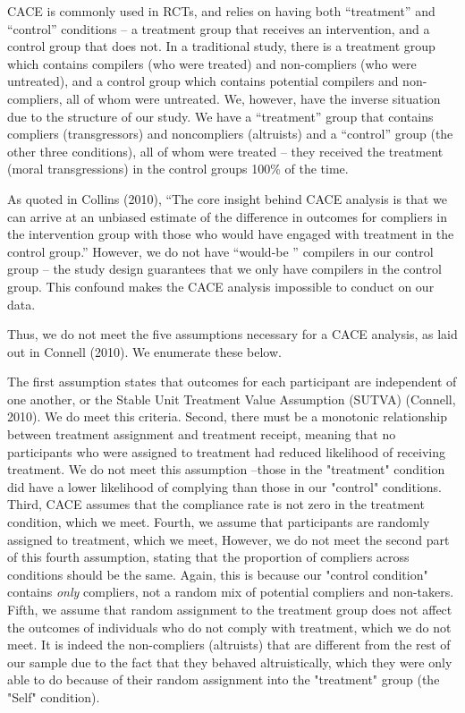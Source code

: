 \documentclass[12pt,]{article}
\begin{document}
CACE is commonly used in RCTs, and relies on having both “treatment” and “control” conditions – a treatment group that receives an intervention, and a control group that does not. In a traditional study, there is a treatment group which contains compilers (who were treated) and non-compliers (who were untreated), and a control group which contains potential compilers and non-compliers, all of whom were untreated. We, however, have the inverse situation due to the structure of our study. We have a “treatment” group that contains compliers (transgressors) and noncompliers (altruists) and a “control” group (the other three conditions), all of whom were treated – they received the treatment (moral transgressions) in the control groups 100\% of the time. 

As quoted in Collins (2010), “The core insight behind CACE analysis is that we can arrive at an unbiased estimate of the difference in outcomes for compliers in the intervention group with those who would have engaged with treatment in the control group.” However, we do not have “would-be '' compilers in our control group – the study design guarantees that we only have compilers in the control group. This confound makes the CACE analysis impossible to conduct on our data. 

Thus, we do not meet the five assumptions necessary for a CACE analysis, as laid out in Connell (2010). We enumerate these below. 

The first assumption states that outcomes for each participant are independent of one another, or the Stable Unit Treatment Value Assumption (SUTVA) (Connell, 2010). We do meet this criteria. Second, there must be a monotonic relationship between treatment assignment and treatment receipt, meaning that no participants who were assigned to treatment had reduced likelihood of receiving treatment. We do not meet this assumption --those in the "treatment" condition did have a lower likelihood of complying than those in our "control" conditions. Third, CACE assumes that the compliance rate is not zero in the treatment condition, which we meet. Fourth, we assume that participants are randomly assigned to treatment, which we meet, However, we do not meet the second part of this fourth assumption, stating that the proportion of compliers across conditions should be the same. Again, this is because our "control condition" contains \emph{only} compliers, not a random mix of potential compliers and non-takers. Fifth, we assume that random assignment to the treatment group does not affect the outcomes of individuals who do not comply with treatment, which we do not meet. It is indeed the non-compliers (altruists) that are different from the rest of our sample due to the fact that they behaved altruistically, which they were only able to do because of their random assignment into the "treatment" group (the "Self" condition). 
\end{document}
